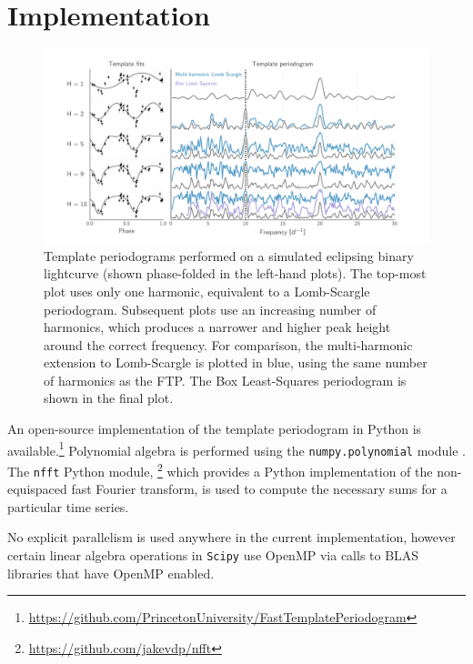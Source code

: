 \documentclass[apj]{emulateapj}
\begin{document}

\section{Implementation}\label{sec:implementation}

\begin{figure}
    \centering
    \includegraphics[width=\textwidth]{templates_and_periodograms.pdf}
    \caption{\label{fig:tempsandpdgs} Template periodograms performed on a simulated eclipsing
            binary lightcurve (shown phase-folded in the left-hand plots). The top-most plot
            uses only one harmonic, equivalent to a Lomb-Scargle periodogram. Subsequent plots
            use an increasing number of harmonics, which produces a narrower and higher peak
            height around the correct frequency. For comparison, the multi-harmonic extension
            to Lomb-Scargle is plotted in blue, using the same number of harmonics as the FTP.
            The Box Least-Squares \citep{Kovacs_2002} periodogram is shown in the final plot.}
\end{figure}

An open-source implementation of the template periodogram in Python is
available.\footnote{\url{https://github.com/PrincetonUniversity/FastTemplatePeriodogram}}
Polynomial algebra is performed using the \texttt{numpy.polynomial} module
\citep{Scipy}. The \texttt{nfft} Python module,
\footnote{\url{https://github.com/jakevdp/nfft}} which provides a Python
implementation of the non-equispaced fast Fourier transform,
is used to compute the necessary sums for a particular time series.

No explicit parallelism is used anywhere in the current implementation,
however certain linear algebra operations in \texttt{Scipy} use OpenMP
via calls to BLAS libraries that have OpenMP enabled.
\end{document}
